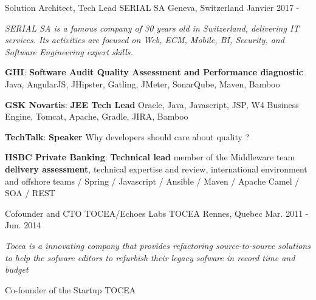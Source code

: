 

\begin{cventries}

\cventry
{Solution Architect, Tech Lead} %
{SERIAL SA} %
{Geneva, Switzerland} %
{Janvier 2017 - } %
{
	\begin{cvitems} %
		\item {\textit{SERIAL SA is a famous company of 30 years old in Switzerland, delivering IT services. Its activities are focused on Web, ECM, Mobile, BI, Security, and Software Engineering expert skills.}}
		\item { \textbf{GHI}: \textbf{Software Audit Quality Assessment and Performance diagnostic} \newline Java, AngularJS, JHipster, Gatling, JMeter, SonarQube, Maven, Bamboo}
		\item { \textbf{GSK Novartis}: \textbf{JEE Tech Lead} \newline Oracle, Java, Javascript, JSP, W4 Business Engine, Tomcat, Apache, Gradle, JIRA, Bamboo}	
		\item { \textbf{TechTalk}: \textbf{Speaker} \newline Why developers should care about quality ?}		
		\item { \textbf{HSBC Private Banking}: \textbf{Technical lead} \newline member of the Middleware team  \textbf{delivery assessment}, technical expertise and review, international environment and offshore teams / Spring / Javascript / Ansible / Maven / Apache Camel / SOA / REST}		
	\end{cvitems}
}

  \cventry
    {Cofounder and CTO TOCEA/Echoes Labs} %
    {TOCEA} %
    {Rennes, Quebec} %
    {Mar. 2011 - Jun. 2014} %
    {
      \begin{cvitems} %
		 \item {\textit{Tocea is a innovating company that provides refactoring source-to-source solutions to help the sofware editors to refurbish their legacy sofware in record time and budget}}
		\item {Co-founder of the Startup TOCEA}        
                

\end{cvitems}}
\end{cventries}
